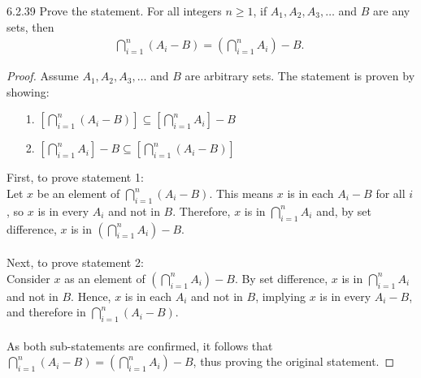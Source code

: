 \begin{question}
    {6.2.39}
    {
        Prove the statement.
        For all integers $n \geq 1$, if $A_1, A_2, A_3, \ldots$ and $B$ are any sets, then
        \begin{align*}
            \bigcap_{i=1}^n (A_i - B) = \left(\bigcap_{i=1}^n A_i \right) - B \text{. }
        \end{align*}
    }
\end{question}
\begin{proof}
    Assume \(A_1, A_2, A_3, \ldots\) and \(B\) are arbitrary sets. The statement is proven by showing:
    \begin{enumerate}
        \item[1.] \(\left[\bigcap_{i = 1}^n (A_i - B)\right] \subseteq \left[\bigcap_{i = 1}^n A_i\right] - B\)
        \item[2.] \(\left[\bigcap_{i = 1}^n A_i\right] - B \subseteq \left[\bigcap_{i = 1}^n (A_i - B)\right]\)
    \end{enumerate}
    First, to prove statement 1: \\
    Let \(x\) be an element of \(\bigcap_{i = 1}^n (A_i - B)\). This means \(x\) is in each \(A_i - B\) for all \(i\), so \(x\) is in every \(A_i\) and not in \(B\). Therefore, \(x\) is in \(\bigcap_{i = 1}^n A_i\) and, by set difference, \(x\) is in \(\left(\bigcap_{i = 1}^n A_i\right) - B\). \\ \\
    Next, to prove statement 2: \\
    Consider \(x\) as an element of \((\bigcap_{i = 1}^n A_i) - B\). By set difference, \(x\) is in \(\bigcap_{i = 1}^n A_i\) and not in \(B\). Hence, \(x\) is in each \(A_i\) and not in \(B\), implying \(x\) is in every \(A_i - B\), and therefore in \(\bigcap_{i = 1}^n (A_i - B)\). \\ \\
    As both sub-statements are confirmed, it follows that \(\bigcap_{i = 1}^n (A_i - B) = \left(\bigcap_{i = 1}^n A_i\right) - B\), thus proving the original statement.
\end{proof}